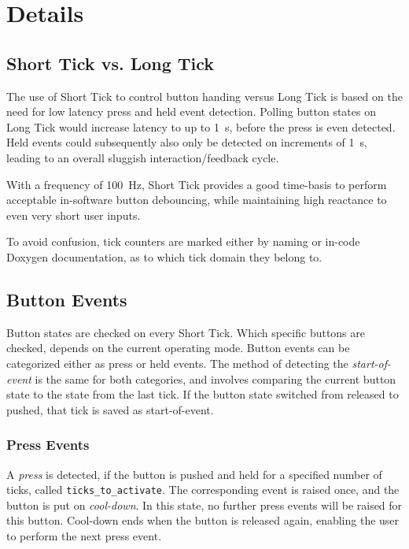 \section{Details}

\subsection{Short Tick vs. Long Tick}

The use of Short Tick to control button handing versus Long Tick is based on the need for low latency press and held event detection. Polling button states on Long Tick would increase latency to up to \SI{1}{\second}, before the press is even detected. Held events could subsequently also only be detected on increments of \SI{1}{\second}, leading to an overall sluggish interaction/feedback cycle.

With a frequency of \SI{100}{\hertz}, Short Tick provides a good time-basis to perform acceptable in-software button debouncing, while maintaining high reactance to even very short user inputs.

To avoid confusion, tick counters are marked either by naming or in-code Doxygen documentation, as to which tick domain they belong to.

\subsection{Button Events}

Button states are checked on every Short Tick. Which specific buttons are checked, depends on the current operating mode. Button events can be categorized either as press or held events. The method of detecting the \emph{start-of-event} is the same for both categories, and involves comparing the current button state to the state from the last tick. If the button state switched from released to pushed, that tick is saved as start-of-event.

\subsubsection{Press Events}

A \emph{press} is detected, if the button is pushed and held for a specified number of ticks, called \texttt{ticks\_to\_activate}. The corresponding event is raised once, and the button is put on \emph{cool-down}. In this state, no further press events will be raised for this button. Cool-down ends when the button is released again, enabling the user to perform the next press event.

